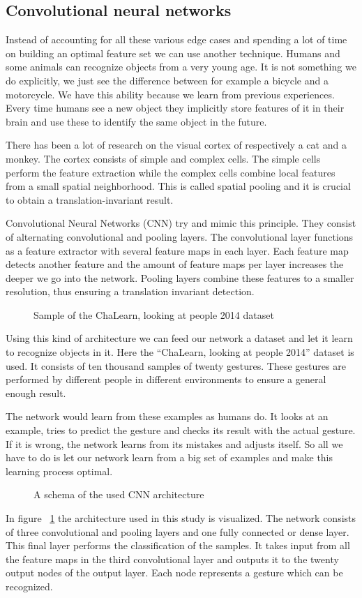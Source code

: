 \documentclass[twocolumn]{phdsymp} %
\begin{document}
\subsection{Convolutional neural networks}

Instead of accounting for all these various edge cases and spending a lot of time on building an optimal feature set we can use another technique. Humans and some animals can recognize objects from a very young age. It is not something we do explicitly, we just see the difference between for example a bicycle and a motorcycle. We have this ability because we learn from previous experiences. Every time humans see a new object they implicitly store features of it in their brain and use these to identify the same object in the future.

There has been a lot of research on the visual cortex of respectively a cat and a monkey. The cortex consists of simple and complex cells. The simple cells perform the feature extraction while the complex cells combine local features from a small spatial neighborhood. This is called spatial pooling and it is crucial to obtain a translation-invariant result.

Convolutional Neural Networks (CNN) try and mimic this principle. They consist of alternating convolutional and pooling layers. The convolutional layer functions as a feature extractor with several feature maps in each layer. Each feature map detects another feature and the amount of feature maps per layer increases the deeper we go into the network. Pooling layers combine these features to a smaller resolution, thus ensuring a translation invariant detection.
\begin{figure}[ht]
	\centering
	\caption{Sample of the ChaLearn, looking at people 2014 dataset}
\end{figure}
Using this kind of architecture we can feed our network a dataset and let it learn to recognize objects in it. Here the “ChaLearn, looking at people 2014” dataset is used. It consists of ten thousand samples of twenty gestures. These gestures are performed by different people in different environments to ensure a general enough result.

The network would learn from these examples as humans do. It looks at an example, tries to predict the gesture and checks its result with the actual gesture. If it is wrong, the network learns from its mistakes and adjusts itself. So all we have to do is let our network learn from a big set of examples and make this learning process optimal.
\begin{figure}[ht]
	\centering
	\caption{A schema of the used CNN architecture}
	\label{fig:schema}
\end{figure}
In figure ~\ref{fig:schema} the architecture used in this study is visualized. The network consists of three convolutional and pooling layers and one fully connected or dense layer. This final layer performs the classification of the samples. It takes input from all the feature maps in the third convolutional layer and outputs it to the twenty output nodes of the output layer. Each node represents a gesture which can be recognized.
\end{document}
